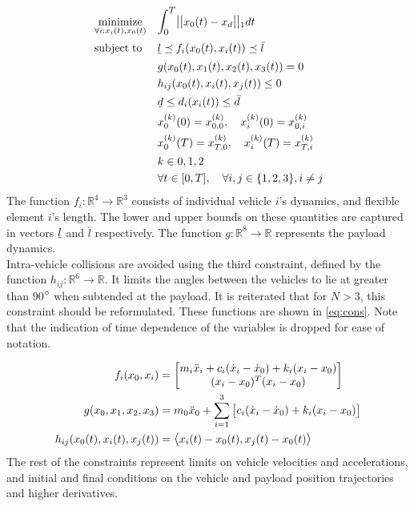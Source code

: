 \documentclass[letterpaper, 10 pt, conference]{ieeeconf}
\newcommand{\ubar}[1]{\text{\b{$#1$}}}
\DeclareMathOperator*{\minimize}{minimize}
\DeclareMathOperator*{\subj}{subject\;to}
\begin{document}
\begin{equation}
  \label{label:central}
  \begin{aligned}
    & \minimize_{\forall i:x_i(t),x_0(t)} && \mathlarger{\int_0^T} \mathlarger{||}x_0(t)-x_d\mathlarger{||}_1 dt \\
    & \subj
    && \ubar{l} \preceq f_i(x_0(t),x_i(t)) \preceq \bar{l}\\
    &       && g(x_0(t),x_1(t),x_2(t),x_3(t)) = 0 \\
    &        && h_{ij}(x_0(t),x_i(t),x_j(t)) \leq 0 \\
    &        && \ubar{d} \leq d_i(x_i(t)) \leq \bar{d} \\
    &       && x_0^{(k)}(0) = x_{0,0}^{(k)}, \quad x_i^{(k)}(0) = x_{0,i}^{(k)} \\
       &       && x_0^{(k)}(T) = x_{T,0}^{(k)} , \quad x_i^{(k)}(T) = x_{T,i}^{(k)} \\
       &       && k\in{0,1,2} \\
    &                                && \forall t \in [0,T], \quad \forall i,j \in \{1,2,3\}, i \neq j
  \end{aligned}
\end{equation}
The function $f_i:\mathbb{R}^4\to\mathbb{R}^3$ consists of individual vehicle $i$'s dynamics, and flexible element $i$'s length. The lower and upper bounds on these quantities are captured in vectors $\ubar{l}$ and $\bar{l}$ respectively. The function $g:\mathbb{R}^8\to\mathbb{R}$ represents the payload dynamics.
\\
 Intra-vehicle collisions are avoided using the third constraint, defined by the function $h_{ij}:\mathbb{R}^6\to\mathbb{R}$. It limits the angles between the vehicles to lie at greater than 90$\degree$ when subtended at the payload. It is reiterated that for $N$$>$$3$, this constraint should be reformulated.
 These functions are shown in \eqref{eq:cons}. Note that the indication of time dependence of the variables is dropped for ease of notation.

 \begin{equation}\label{eq:cons}
 \begin{aligned}
 f_i(x_0,x_i) &=
 \begin{bmatrix}
   m_i\ddot{x}_i + c_i(\dot{x}_i-\dot{x}_0) + k_i(x_i-x_0) \\
  (x_i-x_0)^T(x_i-x_0)
 \end{bmatrix} \\
 g(x_0,x_1,x_2,x_3) &= m_0\ddot{x}_0 +  \sum\limits_{i=1}^{3}
 \begin{bmatrix}{c_i(\dot{x}_i-\dot{x}_0) + k_i(x_i - x_0)} \end{bmatrix}\\
 h_{ij}(x_0(t),x_i(t),x_j(t)) &= \mathlarger{\langle} x_i(t) - x_0(t),x_j(t) - x_0(t) \mathlarger{\rangle}
 \end{aligned}
 \end{equation}
 The rest of the constraints represent limits on vehicle velocities and accelerations, and initial and final conditions on the vehicle and payload position trajectories and higher derivatives.
\end{document}
